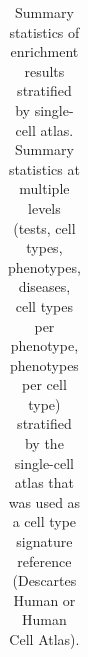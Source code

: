 \documentclass[
]{article}
\begin{document}
\begin{longtable}[]{@{}
  >{\raggedright\arraybackslash}p{}
  >{\raggedright\arraybackslash}p{}
  >{\raggedright\arraybackslash}p{}
  >{\raggedright\arraybackslash}p{}@{}}

\caption{\label{tbl-summary}Summary statistics of enrichment results
stratified by single-cell atlas. Summary statistics at multiple levels
(tests, cell types, phenotypes, diseases, cell types per phenotype,
phenotypes per cell type) stratified by the single-cell atlas that was
used as a cell type signature reference (Descartes Human or Human Cell
Atlas).}

\tabularnewline


\end{longtable}
\end{document}

